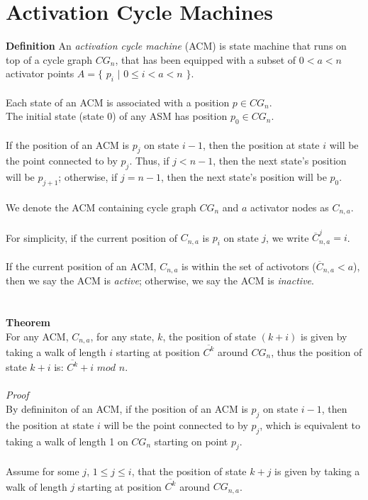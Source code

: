 \documentclass[a4paper,12pt]{article}
\begin{document}
\section{Activation Cycle Machines}
\textbf{Definition}
An \textit{activation cycle machine} (ACM) is state machine that runs on top of a cycle graph $CG_n$, that has been equipped with a subset of $0 < a < n$ activator points $A = \{$ $p_i$ $|$ $0 \leq i < a < n$ $\}$.\\
\\
Each state of an ACM is associated with a position $p \in CG_n$.\\
The initial state (state $0$) of any ASM has position $p_0 \in CG_n$.\\
\\
If the position of an ACM is $p_j$ on state $i - 1$, then the position at state $i$ will be the point connected to by $p_j$.
Thus, if $j < n - 1$, then the next state's position will be $p_{j+1}$; otherwise, if $j = n - 1$, then the next state's position will be $p_0$.\\
\\
We denote the ACM containing cycle graph $CG_n$ and $a$ activator nodes as $C_{n,a}$.\\
\\
For simplicity, if the current position of $C_{n,a}$ is $p_i$ on state $j$, we write $\overline{C}^j_{n,a} = i$.\\ 
\\
If the current position of an ACM, $C_{n,a}$ is within the set of activotors ($\overline{C}_{n,a} < a$), then we say the ACM is \textit{active}; otherwise, we say the ACM is \textit{inactive}.\\
\\
\\
\textbf{Theorem}\\
For any ACM, $C_{n,a}$, for any state, $k$, the position of state $(k + i)$ is given by taking a walk of length $i$ starting at position $\overline{C^k}$ around $CG_n$, thus the position of state $k + i$ is: $\overline{C^k} + i$ $mod$ $n$.\\
\\
\textit{Proof}\\
By defininiton of an ACM, if the position of an ACM is $p_j$ on state $i - 1$, then the position at state $i$ will be the point connected to by $p_j$, which is equivalent to taking a walk of length 1 on $CG_n$ starting on point $p_j$.\\
\\
Assume for some $j$, $1 \leq j \leq i$, that the position of state $k + j$ is given by taking a walk of length $j$ starting at position $\overline{C^k}$ around $CG_{n,a}$.\\
\end{document}
